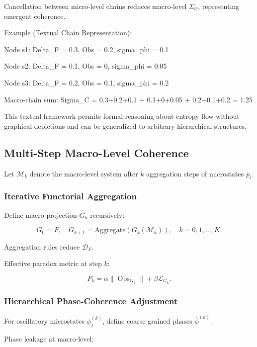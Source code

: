 \documentclass[12pt]{article}
\theoremstyle{plain}
\begin{document}
Cancellation between micro-level chains reduces macro-level \(\Sigma_\mathcal{C}\), representing emergent coherence.

Example (Textual Chain Representation):

Node s1: Delta_F = 0.3, Obs = 0.2, sigma_phi = 0.1

Node s2: Delta_F = 0.1, Obs = 0, sigma_phi = 0.05

Node s3: Delta_F = 0.2, Obs = 0.1, sigma_phi = 0.2

Macro-chain sum: Sigma_C = 0.3+0.2+0.1 + 0.1+0+0.05 + 0.2+0.1+0.2 = 1.25

This textual framework permits formal reasoning about entropy flow without graphical depictions and can be generalized to arbitrary hierarchical structures.

\subsection{Multi-Step Macro-Level Coherence}

Let \(\mathcal{M}_k\) denote the macro-level system after \(k\) aggregation steps of microstates \(p_i\).

\subsubsection{Iterative Functorial Aggregation}

Define macro-projection \(G_k\) recursively:

\begin{equation}
G_0 = F, \quad G_{k+1} = \text{Aggregate}(G_k(\mathcal{M}_k)), \quad k = 0,1,\dots,K.
\end{equation}

Aggregation rules reduce \(\mathcal{D}_F\).

Effective paradox metric at step \(k\):

\begin{equation}
P_k = \alpha \|\operatorname{Obs}_{G_k}\| + \beta \mathcal{L}_{G_k}.
\end{equation}

\subsubsection{Hierarchical Phase-Coherence Adjustment}

For oscillatory microstates \(\phi_j^{(k)}\), define coarse-grained phases \(\overline{\phi}^{(k)}\).

Phase leakage at macro-level:
\end{document}
